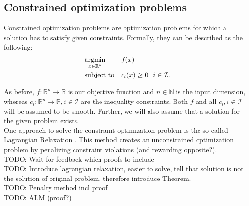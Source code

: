 \subsection{Constrained optimization problems}
Constrained optimization problems are optimization problems for which a solution has to satisfy given constraints. Formally, they can be described as the following:\\
\begin{equation}
	\label{constrained_min_problem}
	\begin{aligned}
		& \underset{x \in \mathbb{R}^n}{\operatorname*{argmin}}
		& & f(x) \\
		& \text{subject to}
		& & c_i(x) \geq 0, \; i \in \mathcal{I}.
	\end{aligned}
\end{equation}

As before, $f\colon \mathbb{R}^n\to \mathbb{R}$ is our objective function and $n \in \mathbb{N}$ is the input dimension, whereas $c_i\colon \mathbb{R}^n\to \mathbb{R}, i \in \mathcal{I}$ are the inequality constraints. Both $f$ and all $c_i, i \in \mathcal{I}$ will be assumed to be smooth. Further, we will also assume that a solution for the given problem exists.\\

\indent One approach to solve the constraint optimization problem is the so-called Lagrangian Relaxation \cite{Lemarechal:2000:LR:647776.734757}. This method creates an unconstrained optimization problem by penalizing constraint violations (and rewarding opposite?).\\

TODO: Wait for feedback which proofs to include\\
TODO: Introduce lagrangian relaxation, easier to solve, tell that solution is not the solution of original problem, therefore introduce Theorem.\\
TODO: Penalty method incl proof\\
TODO: ALM (proof?)\\


